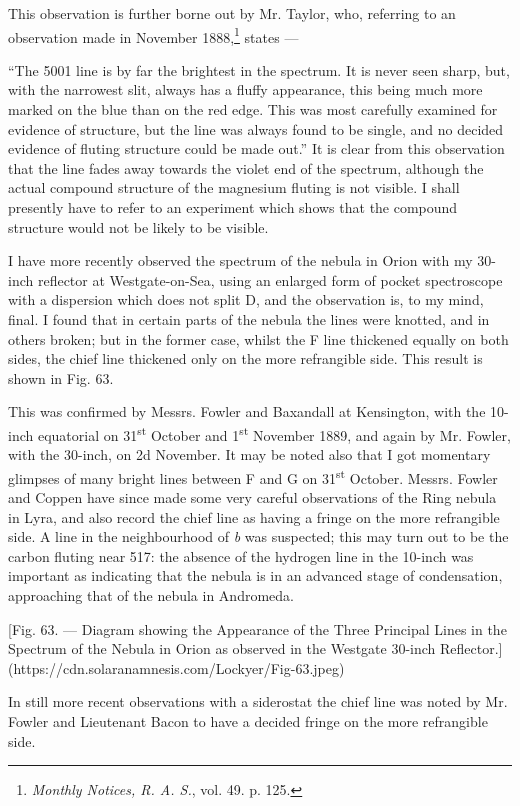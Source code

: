 \documentclass[a4paper, 12pt, oneside, polutonikogreek, english]{article}
\begin{document}
This observation is further borne out by Mr. Taylor, who, referring to an observation made in November 1888,\footnote{\emph{Monthly Notices, R. A. S.}, vol. 49. p. 125.} states ---

``The 5001 line is by far the brightest in the spectrum. It is never seen sharp, but, with the narrowest slit, always has a fluffy appearance, this being much more marked on the blue than on the red edge. This was most carefully examined for evidence of structure, but the line was always found to be single, and no decided evidence of fluting structure could be made out.'' It is clear from this observation that the line fades away towards the violet end of the spectrum, although the actual compound structure of the magnesium fluting is not visible. I shall presently have to refer to an experiment which shows that the compound structure would not be likely to be visible.

I have more recently observed the spectrum of the nebula in Orion with my 30-inch reflector at Westgate-on-Sea, using an enlarged form of pocket spectroscope with a dispersion which does not split D, and the observation is, to my mind, final. I found that in certain parts of the nebula the lines were knotted, and in others broken; but in the former case, whilst the F line thickened equally on both sides, the chief line thickened only on the more refrangible side. This result is shown in Fig. 63.

This was confirmed by Messrs. Fowler and Baxandall at Kensington, with the 10-inch equatorial on 31\textsuperscript{st} October and 1\textsuperscript{st} November 1889, and again by Mr. Fowler, with the 30-inch, on 2d November. It may be noted also that I got momentary glimpses of many bright lines between F and G on 31\textsuperscript{st} October. Messrs. Fowler and Coppen have since made some very careful observations of the Ring nebula in Lyra, and also record the chief line as having a fringe on the more refrangible side. A line in the neighbourhood of \emph{b} was suspected; this may turn out to be the carbon fluting near 517: the absence of the hydrogen line in the 10-inch was important as indicating that the nebula is in an advanced stage of condensation, approaching that of the nebula in Andromeda.

[Fig. 63. --- Diagram showing the Appearance of the Three Principal Lines in the Spectrum of the Nebula in Orion as observed in the Westgate 30-inch Reflector.](https://cdn.solaranamnesis.com/Lockyer/Fig-63.jpeg)

In still more recent observations with a siderostat the chief line was noted by Mr. Fowler and Lieutenant Bacon to have a decided fringe on the more refrangible side.
\end{document}
